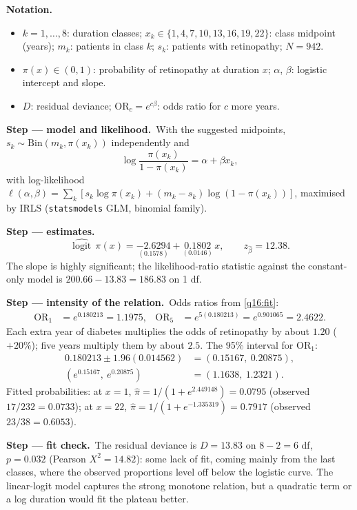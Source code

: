 \documentclass[11pt,a4paper]{article}
\numberwithin{equation}{questao}
\newenvironment{notacao}{\par\smallskip\noindent\textbf{Notation.}\begin{itemize}[leftmargin=1.4em,topsep=1pt,itemsep=0pt]\small}{\end{itemize}}
\newcommand{\passo}[2]{\par\smallskip\noindent\textbf{Step --- #1.}~#2}
\begin{document}
\begin{sol}
\begin{notacao}
\item $k=1,\dots,8$: duration classes; $x_k\in\{1,4,7,10,13,16,19,22\}$: class midpoint (years); $m_k$: patients in class $k$; $s_k$: patients with retinopathy; $N=942$.
\item $\pi(x)\in(0,1)$: probability of retinopathy at duration $x$; $\alpha$, $\beta$: logistic intercept and slope.
\item $D$: residual deviance; $\mathrm{OR}_c=e^{c\beta}$: odds ratio for $c$ more years.
\end{notacao}

\passo{model and likelihood}{With the suggested midpoints, $s_k\sim\mathrm{Bin}(m_k,\pi(x_k))$ independently and
\begin{equation}
\log\frac{\pi(x_k)}{1-\pi(x_k)}=\alpha+\beta x_k, \label{q16:logit}
\end{equation}
with log-likelihood $\ell(\alpha,\beta)=\sum_k[s_k\log\pi(x_k)+(m_k-s_k)\log(1-\pi(x_k))]$, maximised by IRLS (\texttt{statsmodels} GLM, binomial family).}

\passo{estimates}{
\begin{equation}
\widehat{\operatorname{logit}}\,\pi(x)=\underset{(0.1578)}{-2.6294}+\underset{(0.0146)}{0.1802}\,x,\qquad z_{\hat\beta}=12.38 . \label{q16:fit}
\end{equation}
The slope is highly significant; the likelihood-ratio statistic against the constant-only model is
$200.66-13.83=186.83$ on 1 df.}

\passo{intensity of the relation}{Odds ratios from \eqref{q16:fit}:
\begin{align*}
\mathrm{OR}_1&=e^{0.180213}=1.1975, & \mathrm{OR}_5&=e^{5(0.180213)}=e^{0.901065}=2.4622 .
\end{align*}
Each extra year of diabetes multiplies the odds of retinopathy by about $1.20$ ($+20\%$); five years multiply
them by about $2.5$. The 95\% interval for $\mathrm{OR}_1$:
\begin{align*}
0.180213\pm1.96(0.014562)&=(0.15167,\ 0.20875),\\
(e^{0.15167},\ e^{0.20875})&=(1.1638,\ 1.2321).
\end{align*}
Fitted probabilities: at $x=1$, $\hat\pi=1/(1+e^{2.449148})=0.0795$ (observed $17/232=0.0733$); at $x=22$,
$\hat\pi=1/(1+e^{-1.335319})=0.7917$ (observed $23/38=0.6053$).}

\passo{fit check}{The residual deviance is $D=13.83$ on $8-2=6$ df, $p=0.032$ (Pearson $X^2=14.82$): some lack of
fit, coming mainly from the last classes, where the observed proportions level off below the logistic
curve. The linear-logit model captures the strong monotone relation, but a quadratic term or a log
duration would fit the plateau better.}


\end{sol}
\end{document}
